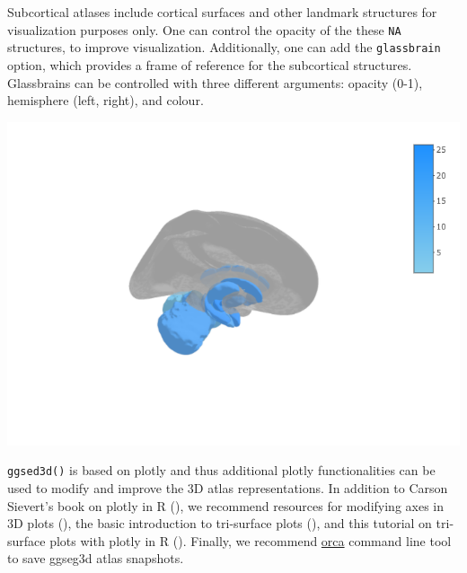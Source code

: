 \documentclass[fleqn,10pt]{wlpeerj} %
\newenvironment{Shaded}{\begin{snugshade}}{\end{snugshade}}
\newcommand{\DataTypeTok}[1]{\textcolor[rgb]{0.13,0.29,0.53}{#1}}
\newcommand{\DecValTok}[1]{\textcolor[rgb]{0.00,0.00,0.81}{#1}}
\newcommand{\FloatTok}[1]{\textcolor[rgb]{0.00,0.00,0.81}{#1}}
\newcommand{\KeywordTok}[1]{\textcolor[rgb]{0.13,0.29,0.53}{\textbf{#1}}}
\newcommand{\NormalTok}[1]{#1}
\newcommand{\OperatorTok}[1]{\textcolor[rgb]{0.81,0.36,0.00}{\textbf{#1}}}
\newcommand{\StringTok}[1]{\textcolor[rgb]{0.31,0.60,0.02}{#1}}
\begin{document}
Subcortical atlases include cortical surfaces and other landmark structures for visualization purposes only.
One can control the opacity of the these \texttt{NA} structures, to improve visualization.
Additionally, one can add the \texttt{glassbrain} option, which provides a frame of reference for the subcortical structures.
Glassbrains can be controlled with three different arguments: opacity (0-1), hemisphere (left, right), and colour.

\begin{Shaded}
\end{Shaded}

\includegraphics[width=0.4\linewidth]{png/ggseg3d_glass}

\texttt{ggsed3d()} is based on plotly and thus additional plotly functionalities can be used to modify and improve the 3D atlas representations.
In addition to Carson Sievert's book on plotly in R (\citeyearpar{plotly}), we recommend resources for modifying axes in 3D plots (\citet{plotly-ax}), the basic introduction to tri-surface plots (\citet{plotly-tri}), and this tutorial on tri-surface plots with plotly in R (\citet{plotly-trisurf}).
Finally, we recommend \href{https://github.com/plotly/orca\#installation}{orca} command line tool to save ggseg3d atlas snapshots.
\end{document}
